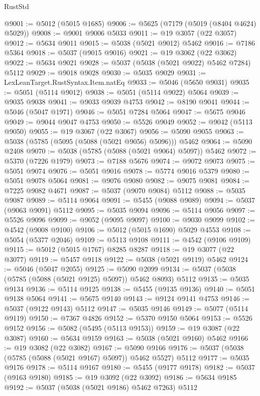 \begin{lexlean}{RustStd}
\begin{coremodule}
@9001 := @5012 (@5015 @1685)
@9006 := @5625 (@7179 (@5019 (@8404 @4624) @5029))
@9008 := @9001 @9006 @5033
@9011 := @19 @3057 (@22 @3057)
@9012 := @5634 @9011
@9015 := @5038 (@5021 @9012) @5462
@9016 := @7186 @5364
@9018 := @5037 (@9015 @9016)
@9021 := @19 @3062 (@22 @3062)
@9022 := @5634 @9021
@9028 := @5037 (@5038 (@5021 @9022) @5462 @7284) @5112
@9029 := @9018 @9028
@9030 := @5035 @9029
@9031 := LexLeanTarget.RustSyntax.Item.natEq
@9033 := @5046 (@5650 @9031)
@9035 := @5051 (@5114 @9012)
@9038 := @5051 (@5114 @9022) @5064
@9039 := @9035 @9038
@9041 := @9033 @9039 @4753
@9042 := @8190 @9041
@9044 := @5046 (@5047 @1971)
@9046 := @5051 @7284 @5064
@9047 := @5675 @9046
@9049 := @9044 @9047 @4753
@9050 := @5526 @9049
@9052 := @9042 (@5113 @9050)
@9055 := @19 @3067 (@22 @3067)
@9056 := @5090 @9055
@9063 := @5038 (@5785 (@5095 (@5088 (@5021 @9056) @5096))) @5462
@9064 := @5090 @2408
@9070 := @5038 (@5785 (@5088 (@5021 @9064) @5097)) @5462
@9072 := @5370 (@7226 @1979)
@9073 := @7188 @5676
@9074 := @9072 @9073
@9075 := @5051 @9074
@9076 := @5051 @9016
@9078 := @5774 @9016 @5379
@9080 := @5051 @9078 @5064
@9081 := @9076 @9080
@9082 := @9075 @9081
@9084 := @7225 @9082 @4671
@9087 := @5037 (@9070 @9084) @5112
@9088 := @5035 @9087
@9089 := @5114 @9064
@9091 := @5455 (@9088 @9089)
@9094 := @5037 (@9063 @9091) @5112
@9095 := @5035 @9094
@9096 := @5114 @9056
@9097 := @5526 @9096
@9099 := @9052 (@9095 @9097)
@9100 := @9030 @9099
@9102 := @4542 (@9008 @9100)
@9106 := @5012 (@5015 @1690) @5029 @4553
@9108 := @5054 (@5377 @2046)
@9109 := @5113 @9108
@9111 := @4542 (@9106 @9109)
@9115 := @5012 (@5015 @1767) @8285 @8287
@9118 := @19 @3077 (@22 @3077)
@9119 := @5457 @9118
@9122 := @5038 (@5021 @9119) @5462
@9124 := @5046 (@5047 @2055)
@9125 := @5090 @2099
@9134 := @5037 (@5038 (@5785 (@5088 (@5021 @9125) @5097)) @5462 @8093) @5112
@9135 := @5035 @9134
@9136 := @5114 @9125
@9138 := @5455 (@9135 @9136)
@9140 := @5051 @9138 @5064
@9141 := @5675 @9140
@9143 := @9124 @9141 @4753
@9146 := @5037 (@9122 @9143) @5112
@9147 := @5035 @9146
@9149 := @5077 (@5114 @9119)
@9150 := @7367 @4826
@9152 := @5370 @9150 @5064
@9153 := @5526 @9152
@9156 := @5082 (@5495 (@5113 @9153))
@9159 := @19 @3087 (@22 @3087)
@9160 := @5634 @9159
@9163 := @5038 (@5021 @9160) @5462
@9166 := @19 @3082 (@22 @3082)
@9167 := @5090 @9166
@9176 := @5037 (@5038 (@5785 (@5088 (@5021 @9167) @5097)) @5462 @5527) @5112
@9177 := @5035 @9176
@9178 := @5114 @9167
@9180 := @5455 (@9177 @9178)
@9182 := @5037 (@9163 @9180)
@9185 := @19 @3092 (@22 @3092)
@9186 := @5634 @9185
@9192 := @5037 (@5038 (@5021 @9186) @5462 @7263) @5112

\end{coremodule}
\end{lexlean}
